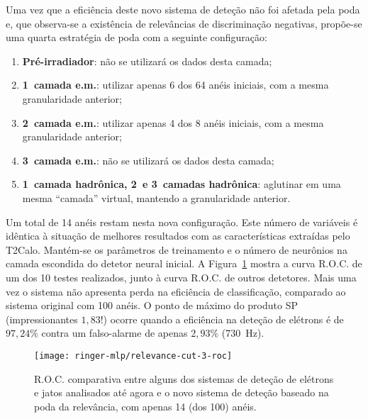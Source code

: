 
Uma vez que a eficiência deste novo sistema de deteção não foi afetada pela
poda e, que observa-se a existência de relevâncias de discriminação negativas,
propõe-se uma quarta estratégia de poda com a seguinte configuração:

\begin{enumerate}
\item \textbf{Pré-irradiador}: não se utilizará os dados desta camada;
\item \textbf{1\eira\ camada e.m.}: utilizar apenas 6 dos 64 anéis iniciais,
com a mesma granularidade anterior;
\item \textbf{2\eira\ camada e.m.}: utilizar apenas 4 dos 8 anéis iniciais,
com a mesma granularidade anterior;
\item \textbf{3\eira\ camada e.m.}: não se utilizará os dados desta camada;
\item \textbf{1\eira\ camada hadrônica, 2\eira\ e 3\eira\ camadas hadrônica}: aglutinar em uma mesma ``camada'' virtual, mantendo a granularidade anterior.
\end{enumerate} 

Um total de 14 anéis restam nesta nova configuração. Este número de variáveis
é idêntica à situação de melhores resultados com as características extraídas
pelo T2Calo. Mantém-se os parâmetros de treinamento e o número de neurônios na
camada escondida do detetor neural inicial. A Figura~\ref{fig:relev-cut-3-roc}
mostra a curva R.O.C. de um dos 10 testes realizados, junto à curva R.O.C. de
outros detetores. Mais uma vez o sistema não apresenta perda na eficiência de
classificação, comparado ao sistema original com 100 anéis. O ponto de máximo
do produto SP (impressionantes $1,83$!) ocorre quando a eficiência na deteção
de elétrons é de $97,24$\% contra um falso-alarme de apenas $2,93$\% (730~Hz).

\begin{figure}
\begin{center}
\texttt{[image: ringer-mlp/relevance-cut-3-roc]}
\end{center}
\caption{R.O.C. comparativa entre alguns dos sistemas de deteção de elétrons e
jatos analisados até agora e o novo sistema de deteção baseado na poda da
relevância, com apenas 14 (dos 100) anéis.}
\label{fig:relev-cut-3-roc}
\end{figure}

